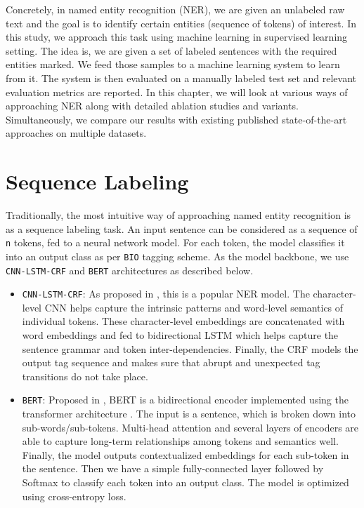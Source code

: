 Concretely, in named entity recognition (NER), we are given an unlabeled raw text and the goal is to identify certain entities (sequence of tokens) of interest. In this study, we approach this task using machine learning in supervised learning setting. The idea is, we are given a set of labeled sentences with the required entities marked. We feed those samples to a machine learning system to learn from it. The system is then evaluated on a manually labeled test set and relevant evaluation metrics are reported. In this chapter, we will look at various ways of approaching NER along with detailed ablation studies and variants. Simultaneously, we compare our results with existing published state-of-the-art approaches on multiple datasets.

\section{Sequence Labeling}
Traditionally, the most intuitive way of approaching named entity recognition is as a sequence labeling task. An input sentence can be considered as a sequence of \texttt{n} tokens, fed to a neural network model. For each token, the model classifies it into an output class as per \texttt{BIO} tagging scheme. As the model backbone, we use \texttt{CNN-LSTM-CRF} and \texttt{BERT} architectures as described below.

\begin{itemize}
    \item \texttt{CNN-LSTM-CRF}: As proposed in \cite{ma2016end}, this is a popular NER model. The character-level CNN helps capture the intrinsic patterns and word-level semantics of individual tokens. These character-level embeddings are concatenated with word embeddings and fed to bidirectional LSTM\cite{} which helps capture the sentence grammar and token inter-dependencies. Finally, the CRF models the output tag sequence and makes sure that abrupt and unexpected tag transitions do not take place. 
    
    \item \texttt{BERT}: Proposed in \cite{devlin2018bert}, BERT is a bidirectional encoder implemented using the transformer architecture \cite{}. The input is a sentence, which is broken down into sub-words/sub-tokens. Multi-head attention and several layers of encoders are able to capture long-term relationships among tokens and semantics well. Finally, the model outputs contextualized embeddings for each sub-token in the sentence. Then we have a simple fully-connected layer followed by Softmax to classify each token into an output class. The model is optimized using cross-entropy loss.
\end{itemize}

